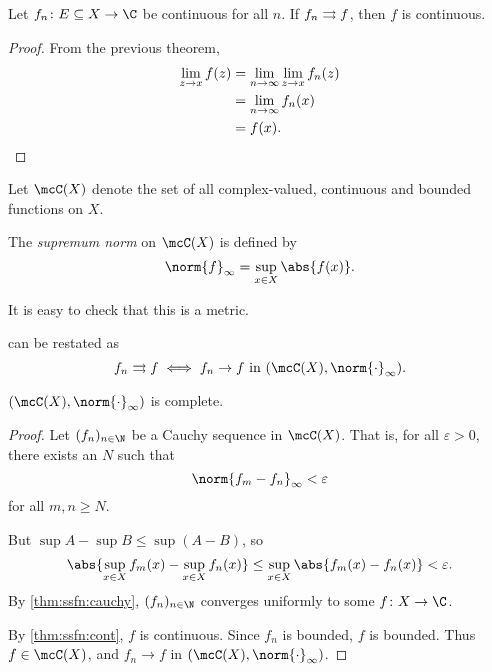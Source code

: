 \begin{theorem*} \label{thm:ssfn:cont}
    Let $f_n\colon E \subseteq X \to \C$ be continuous for all $n$.
    If $f_n \rightrightarrows f$, then $f$ is continuous.
\end{theorem*}
\begin{proof}
    From the previous theorem, \begin{align*}
        \lim_{z \to x} f(z) &= \lim_{n \to \infty} \lim_{z \to x} f_n(z) \\
        &= \lim_{n \to \infty} f_n(x) \\
        &= f(x). \qedhere
    \end{align*}
\end{proof}

\begin{definition} \label{def:ssfn:supnorm}
    Let $\mcC(X)$ denote the set of all complex-valued, continuous and
    bounded functions on $X$.

    The \emph{supremum norm} on $\mcC(X)$ is defined by \[
        \norm{f}_\infty = \sup_{x \in X} \abs{f(x)}.
    \]
\end{definition}
It is easy to check that this is a metric.
\begin{remark}
     can be restated as \[
        f_n \unifto f \iff f_n \to f \text{ in } (\mcC(X), \norm{\cdot}_\infty).
    \]
\end{remark}

\begin{theorem}[Completeness] \label{thm:ssfn:cont:completeness}
    $(\mcC(X), \norm{\cdot}_\infty)$ is complete.
\end{theorem}
\begin{proof}
    Let $(f_n)_{n \in \N}$ be a Cauchy sequence in $\mcC(X)$.
    That is, for all $\varepsilon > 0$, there exists an $N$ such that \[
        \norm{f_m - f_n}_\infty < \varepsilon
    \] for all $m, n \ge N$.

    But $\sup A - \sup B \le \sup (A - B)$, so \[
        \abs{\sup_{x \in X} f_m(x) - \sup_{x \in X} f_n(x)}
            \le \sup_{x \in X} \abs{f_m(x) - f_n(x)} < \varepsilon.
    \] By \cref{thm:ssfn:cauchy}, $(f_n)_{n \in \N}$ converges uniformly
    to some $f\colon X \to \C$.

    By \cref{thm:ssfn:cont}, $f$ is continuous.
    Since $f_n$ is bounded, $f$ is bounded.
    Thus $f \in \mcC(X)$, and $f_n \to f$ in $(\mcC(X), \norm{\cdot}_\infty)$.
\end{proof}
